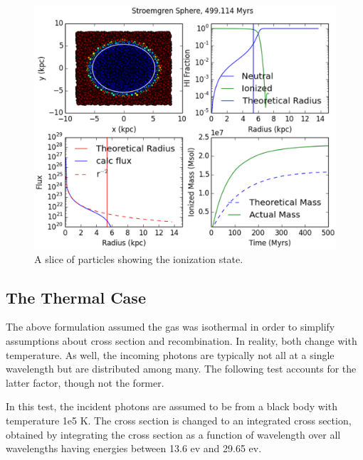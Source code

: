\begin{figure}
\includegraphics[width=\textwidth]{graphics/ifront6401000.eps}
\caption[The isothermal Str\"omgren Sphere.]{A slice of particles showing the ionization state.}
\label{fig:stromgreniso}
\end{figure}

\subsection{The Thermal Case}
\label{sec:thermalstromgren}

The above formulation assumed the gas was isothermal in order to simplify assumptions about cross section and recombination. In reality, both change with temperature. As well, the incoming photons are typically not all at a single wavelength but are distributed among many. The following test accounts for the latter factor, though not the former.

In this test, the incident photons are assumed to be from a black body with temperature 1e5 K. The cross section is changed to an integrated cross section, obtained by integrating the cross section as a function of wavelength over all wavelengths having energies between 13.6 ev and 29.65 ev.

